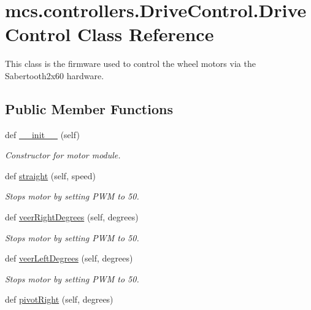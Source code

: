 \hypertarget{classmcs_1_1controllers_1_1DriveControl_1_1DriveControl}{}\section{mcs.\+controllers.\+Drive\+Control.\+Drive\+Control Class Reference}
\label{classmcs_1_1controllers_1_1DriveControl_1_1DriveControl}


This class is the firmware used to control the wheel motors via the Sabertooth2x60 hardware.  


\subsection*{Public Member Functions}
\begin{DoxyCompactItemize}
\item 
def \hyperlink{classmcs_1_1controllers_1_1DriveControl_1_1DriveControl_a402c077fc5e41d37d31f4539bc8b06d5}{\+\_\+\+\_\+init\+\_\+\+\_\+} (self)
\begin{DoxyCompactList}\small\item\em Constructor for motor module. \end{DoxyCompactList}\item 
def \hyperlink{classmcs_1_1controllers_1_1DriveControl_1_1DriveControl_ace694471ffe5221643cfb3a139736cd9}{straight} (self, speed)
\begin{DoxyCompactList}\small\item\em Stops motor by setting P\+WM to 50. \end{DoxyCompactList}\item 
def \hyperlink{classmcs_1_1controllers_1_1DriveControl_1_1DriveControl_a5597c6800e01c9c4a1d08053abd72049}{veer\+Right\+Degrees} (self, degrees)
\begin{DoxyCompactList}\small\item\em Stops motor by setting P\+WM to 50. \end{DoxyCompactList}\item 
def \hyperlink{classmcs_1_1controllers_1_1DriveControl_1_1DriveControl_a0a1a5311d7ab61b4f34f08d375b1e58a}{veer\+Left\+Degrees} (self, degrees)
\begin{DoxyCompactList}\small\item\em Stops motor by setting P\+WM to 50. \end{DoxyCompactList}\item 
def \hyperlink{classmcs_1_1controllers_1_1DriveControl_1_1DriveControl_aa115857b647d825ed43247fffa29598e}{pivot\+Right} (self, degrees)

\end{DoxyCompactItemize}

